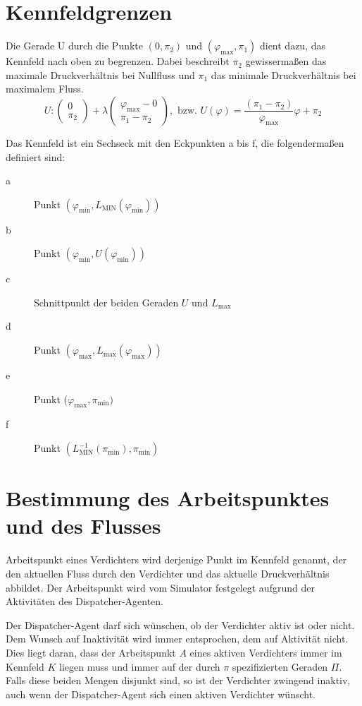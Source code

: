 \documentclass{article}
\newcommand{\pimin}{\pi_\text{min}}
\newcommand{\phimin}{\varphi_\text{min}}
\newcommand{\phimax}{\varphi_\text{max}}
\newcommand{\LMIN}{L_\text{MIN}}
\newcommand{\Lmax}{L_\text{max}}
\begin{document}
\section{Kennfeldgrenzen}

Die Gerade U durch die Punkte $(0, \pi_2)$ und $(\phimax, \pi_1)$ dient dazu, das Kennfeld nach oben zu begrenzen.
Dabei beschreibt $\pi_2$  gewissermaßen das maximale Druckverhältnis bei Nullfluss und $\pi_1$ das minimale Druckverhältnis bei maximalem Fluss.
$$U: \begin{pmatrix} 0 \\ \pi_2 \end{pmatrix} + \lambda \begin{pmatrix} \phimax - 0 \\ \pi_1 - \pi_2 \end{pmatrix},\text{ bzw. } U(\varphi)=\frac{(\pi_1-\pi_2)}{\phimax}\varphi+\pi_2$$


Das Kennfeld ist ein Sechseck mit den Eckpunkten a bis f, die folgendermaßen definiert sind:
\begin{description}

\item[a]  Punkt $(\varphi_\text{min},L_\text{MIN}(\varphi_\text{min}))$
\item[b]  Punkt $(\varphi_\text{min}, U(\phimin))$
\item [c] Schnittpunkt der beiden Geraden $U$ und $\Lmax$
\item [d] Punkt $(\phimax, \Lmax(\phimax))$
\item [e] Punkt ($\phimax, \pimin)$  
\item [f] Punkt $(\LMIN^{-1}(\pimin), \pimin)$ 

\end{description}


\section{ Bestimmung des Arbeitspunktes und des Flusses}

Arbeitspunkt eines Verdichters wird derjenige Punkt im Kennfeld genannt, der den aktuellen Fluss durch den Verdichter und das aktuelle Druckverhältnis abbildet. Der Arbeitspunkt wird vom Simulator festgelegt aufgrund der Aktivitäten des Dispatcher-Agenten.

Der Dispatcher-Agent darf sich wünschen, ob der Verdichter aktiv ist
oder nicht. Dem Wunsch auf Inaktivität wird immer entsprochen, dem auf
Aktivität nicht. Dies liegt daran, dass der Arbeitspunkt $A$ eines aktiven Verdichters immer im Kennfeld $K$
liegen muss und immer auf der durch $\pi$ spezifizierten Geraden $\Pi$. Falls diese beiden Mengen disjunkt sind, so ist der Verdichter zwingend inaktiv, auch wenn der Dispatcher-Agent sich einen aktiven Verdichter wünscht.
\end{document}
